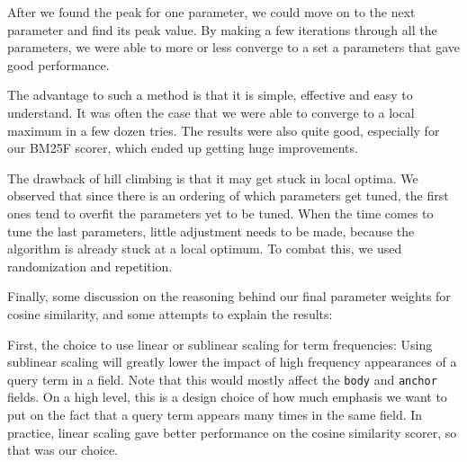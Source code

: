 \documentclass[10pt,twocolumn]{article}
\begin{document}
After we found the peak for one parameter, we could move on to the next parameter and find its peak value. By making a few iterations through all the parameters, we were able to more or less converge to a set a parameters that gave good performance.

The advantage to such a method is that it is simple, effective and easy to understand. It was often the case that we were able to converge to a local maximum in a few dozen tries. The results were also quite good, especially for our BM25F scorer, which ended up getting huge improvements.

The drawback of hill climbing is that it may get stuck in local optima. We observed that since there is an ordering of which parameters get tuned, the first ones tend to overfit the parameters yet to be tuned. When the time comes to tune the last parameters, little adjustment needs to be made, because the algorithm is already stuck at a local optimum. To combat this, we used randomization and repetition.

Finally, some discussion on the reasoning behind our final parameter weights for cosine similarity, and some attempts to explain the results:

First, the choice to use linear or sublinear scaling for term frequencies: Using sublinear scaling will greatly lower the impact of high frequency appearances of a query term in a field. Note that this would mostly affect the \texttt{body} and \texttt{anchor} fields. On a high level, this is a design choice of how much emphasis we want to put on the fact that a query term appears many times in the same field. In practice, linear scaling gave better performance on the cosine similarity scorer, so that was our choice.
\end{document}
